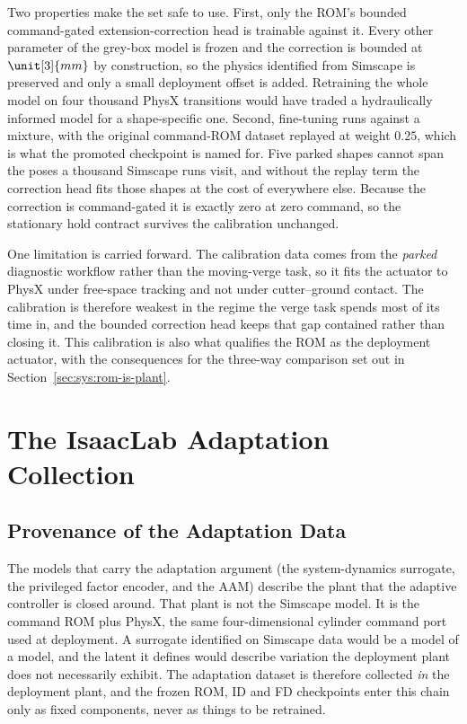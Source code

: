 Two properties make the set safe to use. First, only the ROM's bounded
command-gated extension-correction head is trainable against it. Every other
parameter of the grey-box model is frozen and the correction is bounded at
$\unit[3]{mm}$ by construction, so the physics identified from Simscape is
preserved and only a small deployment offset is added. Retraining the whole
model on four thousand PhysX transitions would have traded a hydraulically
informed model for a shape-specific one. Second, fine-tuning runs against a
mixture, with the original command-ROM dataset replayed at weight $0.25$, which
is what the promoted checkpoint is named for. Five parked shapes cannot span
the poses a thousand Simscape runs visit, and without the replay term the
correction head fits those shapes at the cost of everywhere else. Because the
correction is command-gated it is exactly zero at zero command, so the
stationary hold contract survives the calibration unchanged.

One limitation is carried forward. The calibration data comes from the
\emph{parked} diagnostic workflow rather than the moving-verge task, so it
fits the actuator to PhysX under free-space tracking and not under
cutter--ground contact. The calibration is therefore weakest in the regime the
verge task spends most of its time in, and the bounded correction head keeps
that gap contained rather than closing it. This calibration is also what
qualifies the ROM as the deployment actuator, with the consequences for the
three-way comparison set out in Section~\ref{sec:sys:rom-is-plant}.

\section{The IsaacLab Adaptation Collection}
\label{sec:data:isaaclab}

\subsection{Provenance of the Adaptation Data}

The models that carry the adaptation argument
(the system-dynamics surrogate, the privileged factor encoder, and the
AAM) describe the plant that the adaptive controller is closed around. That
plant is not the Simscape model. It is the command ROM plus PhysX, the
same four-dimensional cylinder command port used at deployment. A
surrogate identified on Simscape data would be a model of a model, and
the latent it defines would describe variation the deployment plant does
not necessarily exhibit. The adaptation dataset is therefore collected
\emph{in} the deployment plant, and the frozen ROM, ID and FD
checkpoints enter this chain only as fixed components, never as things
to be retrained.

